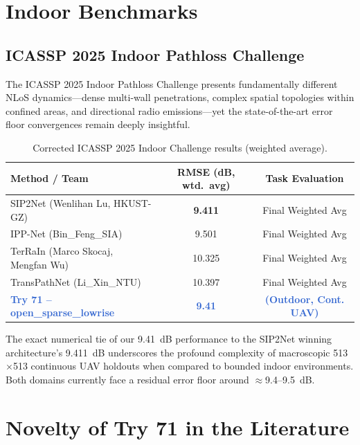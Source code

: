 \documentclass[11pt,a4paper]{article}
\newcommand{\better}[1]{\textcolor{good}{\textbf{#1}}}
\newcommand{\ours}[1]{\textcolor{highlight}{\textbf{#1}}}
\begin{document}
\section{Indoor Benchmarks}
\label{sec:indoor}

\subsection{ICASSP 2025 Indoor Pathloss Challenge}

The ICASSP 2025 Indoor Pathloss Challenge \cite{icassp2025indoor} presents fundamentally different NLoS dynamics—dense multi-wall penetrations, complex spatial topologies within confined areas, and directional radio emissions—yet the state-of-the-art error floor convergences remain deeply insightful.

\begin{table}[h!]
\centering
\caption{Corrected ICASSP 2025 Indoor Challenge results (weighted average).}
\label{tab:icassp2025}
\small
\begin{tabular}{lcc}
\toprule
\textbf{Method / Team} & \textbf{RMSE (dB, wtd.\ avg)} & \textbf{Task Evaluation} \\
\midrule
SIP2Net (Wenlihan Lu, HKUST-GZ) \cite{sip2net2025} & \better{9.411} & Final Weighted Avg \\
IPP-Net (Bin\_Feng\_SIA) \cite{ippnet2025} & 9.501 & Final Weighted Avg \\
TerRaIn (Marco Skocaj, Mengfan Wu) \cite{terrain2025} & 10.325 & Final Weighted Avg \\
TransPathNet (Li\_Xin\_NTU) \cite{transPathNet2025} & 10.397 & Final Weighted Avg \\
\midrule
\ours{Try 71 -- open\_sparse\_lowrise} & \ours{9.41} & \ours{(Outdoor, Cont. UAV)} \\
\bottomrule
\end{tabular}
\end{table}
\normalsize
The exact numerical tie of our 9.41~dB performance to the SIP2Net \cite{sip2net2025} winning architecture's 9.411~dB underscores the profound complexity of macroscopic 513$\times$513 continuous UAV holdouts when compared to bounded indoor environments. Both domains currently face a residual error floor around $\approx$9.4--9.5~dB.

\section{Novelty of Try 71 in the Literature}
\label{sec:novelty}
\end{document}
